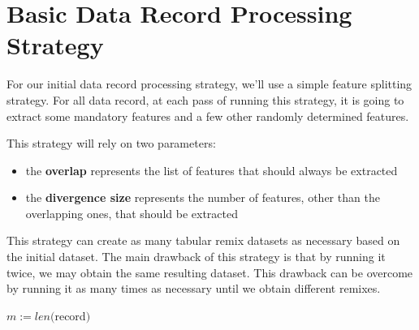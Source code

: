 \documentclass[a4paper,12pt]{article}
\begin{document}
\section{Basic Data Record Processing Strategy}
\begin{FlushLeft}
    For our initial data record processing strategy, we'll use a simple feature
    splitting strategy. For all data record, at each pass of running this strategy,
    it is going to extract some mandatory features and a few other randomly
    determined features.
\end{FlushLeft}
\begin{FlushLeft}
    This strategy will rely  on two parameters:
    \begin{itemize}
        \item the \textbf{overlap} represents the list of features that should always be extracted
        \item the \textbf{divergence size} represents the number of features, other than the overlapping ones, that should be extracted
    \end{itemize}
\end{FlushLeft}
\begin{FlushLeft}
    This strategy can create as many tabular remix datasets as necessary based on
    the initial dataset. The main drawback of this strategy is that by running it
    twice, we may obtain the same resulting dataset. This drawback can be overcome
    by running it as many times as necessary until we obtain different remixes.
\end{FlushLeft}
\begin{algorithmic}
\Require$m := len($record$)$
\EndFunction
\end{algorithmic}
\end{document}
